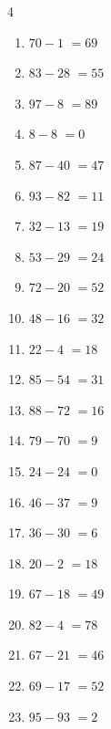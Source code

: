 \begin{multicols}{4}
\begin{enumerate}
  \item $70-1$
        $=69$

  \item $83-28$
        $=55$

  \item $97-8$
        $=89$

  \item $8-8$
        $=0$

  \item $87-40$
        $=47$

  \item $93-82$
        $=11$

  \item $32-13$
        $=19$

  \item $53-29$
        $=24$

  \item $72-20$
        $=52$

  \item $48-16$
        $=32$

  \item $22-4$
        $=18$

  \item $85-54$
        $=31$

  \item $88-72$
        $=16$

  \item $79-70$
        $=9$

  \item $24-24$
        $=0$

  \item $46-37$
        $=9$

  \item $36-30$
        $=6$

  \item $20-2$
        $=18$

  \item $67-18$
        $=49$

  \item $82-4$
        $=78$

\columnbreak %

  \item $67-21$
        $=46$

  \item $69-17$
        $=52$

  \item $95-93$
        $=2$


\end{enumerate}
\end{multicols}

